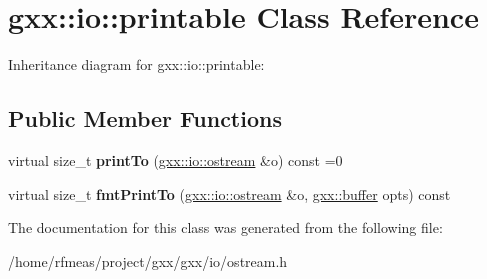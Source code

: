 \hypertarget{classgxx_1_1io_1_1printable}{}\section{gxx\+:\+:io\+:\+:printable Class Reference}
\label{classgxx_1_1io_1_1printable}


Inheritance diagram for gxx\+:\+:io\+:\+:printable\+:
\subsection*{Public Member Functions}
\begin{DoxyCompactItemize}
\item 
virtual size\+\_\+t {\bfseries print\+To} (\hyperlink{classgxx_1_1io_1_1ostream}{gxx\+::io\+::ostream} \&o) const =0\hypertarget{classgxx_1_1io_1_1printable_a0bfddbbbdfd00b72283f6ba11f7b979d}{}\label{classgxx_1_1io_1_1printable_a0bfddbbbdfd00b72283f6ba11f7b979d}

\item 
virtual size\+\_\+t {\bfseries fmt\+Print\+To} (\hyperlink{classgxx_1_1io_1_1ostream}{gxx\+::io\+::ostream} \&o, \hyperlink{classgxx_1_1buffer}{gxx\+::buffer} opts) const \hypertarget{classgxx_1_1io_1_1printable_ab1c5950c1fb90f37117ffef595230768}{}\label{classgxx_1_1io_1_1printable_ab1c5950c1fb90f37117ffef595230768}

\end{DoxyCompactItemize}


The documentation for this class was generated from the following file\+:\begin{DoxyCompactItemize}
\item 
/home/rfmeas/project/gxx/gxx/io/ostream.\+h\end{DoxyCompactItemize}

